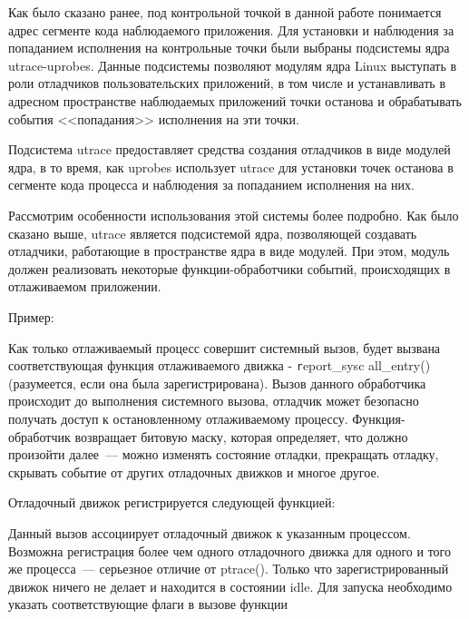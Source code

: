 Как было сказано ранее, под контрольной точкой в данной работе
понимается адрес сегменте кода наблюдаемого приложения.
Для установки и наблюдения за попаданием исполнения на
контрольные точки были выбраны подсистемы ядра utrace-uprobes.
Данные подсистемы позволяют модулям ядра Linux выступать в
роли отладчиков пользовательских приложений, в том числе и
устанавливать в адресном пространстве наблюдаемых приложений
точки останова и обрабатывать события <<попадания>> исполнения
на эти точки.

Подсистема utrace предоставляет средства создания 
отладчиков в виде модулей ядра, в то время, как 
uprobes использует utrace для установки точек 
останова в сегменте кода процесса и наблюдения за попаданием 
исполнения на них. 

Рассмотрим особенности использования этой системы 
более подробно. Как было сказано выше, utrace является подсистемой 
ядра, позволяющей создавать отладчики, работающие в 
пространстве ядра в виде модулей. При этом, модуль 
должен реализовать некоторые функции-обработчики 
событий, происходящих в отлаживаемом приложении. 

Пример:



\bigskip
Как только отлаживаемый процесс совершит системный вызов, будет вызвана 
соответствующая функция отлаживаемого движка - {\texttt report\_sysc
all\_entry()} (разумеется, если она была зарегистрирована). Вызов 
данного обработчика происходит до выполнения системного вызова, 
отладчик может безопасно получать доступ к остановленному отлаживаемому 
процессу. Функция-обработчик возвращает битовую маску, которая определяет, что 
должно произойти далее~--- можно изменять состояние отладки, 
прекращать отладку, скрывать событие от других отладочных 
движков и многое другое. 

Отладочный движок регистрируется следующей функцией: 



\bigskip 
Данный вызов ассоциирует отладочный движок к указанным процессом. 
Возможна регистрация более чем одного отладочного движка для 
одного и того же процесса~--- серьезное отличие от ptrace(). 
Только что зарегистрированный движок ничего не делает и 
находится в состоянии idle. Для запуска необходимо указать 
соответствующие флаги в вызове функции 

